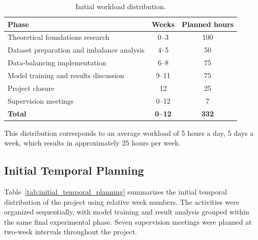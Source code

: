 \begin{table}[htbp]
    \centering
    \caption{Initial workload distribution.}
    \label{tab:initial_workload}
    \renewcommand{\arraystretch}{1.15}
    \begin{tabular}{p{}cc}
        \toprule
        \textbf{Phase} & \textbf{Weeks} & \textbf{Planned hours} \\
        \midrule
        Theoretical foundations research
            & 0--3 & 100 \\

        Dataset preparation and imbalance analysis
            & 4--5 & 50 \\

        Data-balancing implementation
            & 6--8 & 75 \\

        Model training and results discussion
            & 9--11 & 75 \\

        Project closure
            & 12 & 25 \\

        Supervision meetings
            & 0--12 & 7 \\
        \midrule
        \textbf{Total}
            & \textbf{0--12} & \textbf{332} \\
        \bottomrule
    \end{tabular}
\end{table}

This distribution corresponds to an average workload of 5 hours a day, 5 days a week, which results in approximately 25 hours per week.

\subsection{Initial Temporal Planning}
\label{subsec:initial_temporal_planning}

Table~\ref{tab:initial_temporal_planning} summarizes the initial temporal distribution of the project using relative week numbers. The activities were organized sequentially, with model training and result analysis grouped within the same final experimental phase. Seven supervision meetings were planned at two-week intervals throughout the project.

